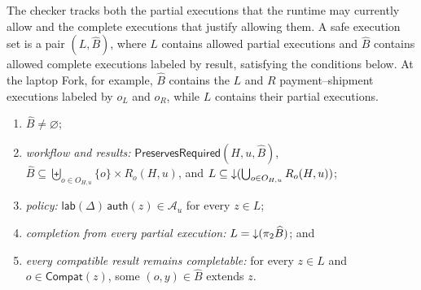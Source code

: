 \begin{definition}
\label{def:safe-execution-set}
The checker tracks both the partial executions that the runtime may currently allow and the complete executions that justify allowing them.
A safe execution set is a pair \((L,\widehat B)\), where \(L\) contains allowed partial executions and \(\widehat B\) contains allowed complete executions labeled by result, satisfying the conditions below.
At the laptop Fork, for example, \(\widehat B\) contains the \(L\) and \(R\) payment--shipment executions labeled by \(o_L\) and \(o_R\), while \(L\) contains their partial executions.
\begin{enumerate}[leftmargin=*,itemsep=1pt]
 \item \(\widehat B\ne\varnothing\);
 \item \emph{workflow and results:} \(\mathsf{PreservesRequired}(H,u,\widehat B)\), \(\widehat B\subseteq \biguplus_{o\in O_{H,u}}\{o\}\times R_o(H,u)\), and \(L\subseteq\mathord{\downarrow}(\bigcup_{o\in O_{H,u}}R_o(H,u))\);
 \item \emph{policy:} \(\mathsf{lab}(\Delta)\,\mathsf{auth}(z)\in\mathcal A_u\) for every \(z\in L\);
 \item \emph{completion from every partial execution:} \(L=\mathord{\downarrow}(\pi_2\widehat B)\); and
 \item \emph{every compatible result remains completable:} for every \(z\in L\) and \(o\in\mathsf{Compat}(z)\), some \((o,y)\in\widehat B\) extends \(z\).
\end{enumerate}
\end{definition}

